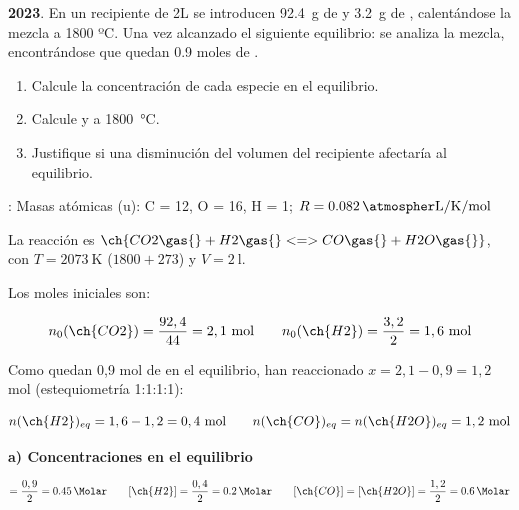 \begin{exerciseEVAU}
    \textbf{2023}.
    En un recipiente de 2L se introducen \SI{92,4}{\g} de  y \SI{3,2}{\g} de , calentándose la mezcla a 1800 ºC. Una vez alcanzado el siguiente equilibrio:  se analiza la mezcla, encontrándose que quedan \num{0,9} moles de .

    \begin{enumerate}[label=\letraminuscula]
        \item Calcule la concentración de cada especie en el equilibrio.
        \item Calcule \Kc{} y \Kp{} a \SI{1800}{\celsius}.
        \item Justifique si una disminución del volumen del recipiente afectaría al equilibrio.
    \end{enumerate}

    \datos{}: Masas atómicas (u): C = 12, O = 16, H = 1; \(R = \ctegases\)

    \begin{solu}

        La reacción es \(\ch{CO2 \gas{} + H2 \gas{} <=> CO \gas{} + H2O \gas{}}\), con \(T = \SI{2073}{\kelvin}\) (\(1800+273\)) y \(V = \SI{2}{\litre}\).

        Los moles iniciales son:

        \begin{equation*}
            n_0(\ch{CO2}) = \dfrac{92,4}{44} = 2,1 \ \text{mol} \qquad n_0(\ch{H2}) = \dfrac{3,2}{2} = 1,6 \ \text{mol}
        \end{equation*}

        Como quedan 0,9 mol de  en el equilibrio, han reaccionado \(x = 2,1 - 0,9 = 1,2\) mol (estequiometría 1:1:1:1):

        \begin{equation*}
            n(\ch{H2})_{eq} = 1,6 - 1,2 = 0,4 \ \text{mol} \qquad n(\ch{CO})_{eq} = n(\ch{H2O})_{eq} = 1,2 \ \text{mol}
        \end{equation*}

        \textbf{a) Concentraciones en el equilibrio}

        \begin{equation*}
            [\ch{CO2}] = \dfrac{0,9}{2} = \SI{0.45}{\Molar} \qquad [\ch{H2}] = \dfrac{0,4}{2} = \SI{0.2}{\Molar} \qquad [\ch{CO}] = [\ch{H2O}] = \dfrac{1,2}{2} = \SI{0.6}{\Molar}
        \end{equation*}


\end{solu}
\end{exerciseEVAU}
